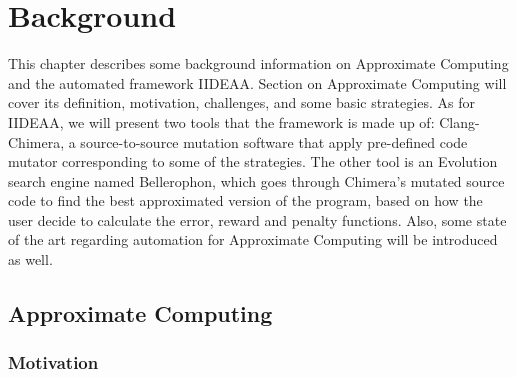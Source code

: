 \chapter{Background}

This chapter describes some background information on Approximate Computing and the automated framework IIDEAA. Section on Approximate Computing will cover its definition, motivation, challenges, and some basic strategies. As for IIDEAA, we will present two tools that the framework is made up of: Clang-Chimera, a source-to-source mutation software that apply pre-defined code mutator corresponding to some of the strategies. The other tool is an Evolution search engine named Bellerophon, which goes through Chimera's mutated source code to find the best approximated version of the program, based on how the user decide to calculate the error, reward and penalty functions. Also, some state of the art regarding automation for Approximate Computing will be introduced as well.\\

\section{Approximate Computing}

\subsection{Motivation}

